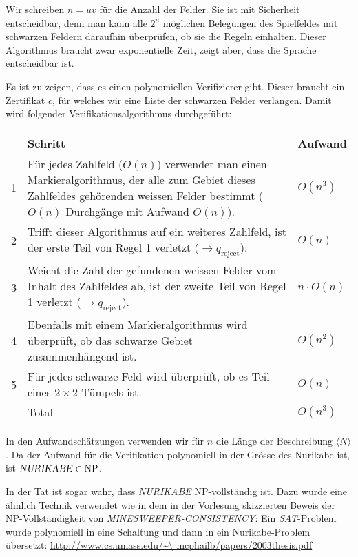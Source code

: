 \begin{loesung}
Wir schreiben $n=uv$ für die Anzahl der Felder.
Sie ist mit Sicherheit entscheidbar, denn man kann alle $2^{n}$
möglichen Belegungen des Spielfeldes mit schwarzen Feldern daraufhin
überprüfen, ob sie die Regeln einhalten. Dieser Algorithmus braucht
zwar exponentielle Zeit, zeigt aber, dass die Sprache entscheidbar ist.

Es ist zu zeigen, dass es einen polynomiellen Verifizierer gibt. Dieser
braucht ein Zertifikat $c$, für welches wir eine Liste der schwarzen
Felder verlangen. Damit wird folgender Verifikationsalgorithmus
durchgeführt:

\begin{tabular}{rll}
&Schritt&Aufwand\\
\hline
1&\begin{minipage}[t]{4.2truein}\strut
Für jedes Zahlfeld ($O(n)$) verwendet man einen Markieralgorithmus,
der alle zum Gebiet dieses Zahlfeldes gehörenden weissen
Felder bestimmt ($O(n)$ Durchgänge mit Aufwand
$O(n)$).\strut\end{minipage}&$O(n^3)$\\
2&\begin{minipage}[t]{4.2truein}\strut
Trifft dieser Algorithmus auf ein weiteres
Zahlfeld, ist der erste Teil von Regel 1 verletzt
($\to q_{\text{reject}}$).
\strut\end{minipage}&$O(n)$\\
3&\begin{minipage}[t]{4.2truein}\strut
Weicht die Zahl der gefundenen weissen Felder vom Inhalt des Zahlfeldes
ab, ist der zweite Teil von Regel 1 verletzt
($\to q_{\text{reject}}$).\strut\end{minipage}&$n\cdot O(n)$\\
4&\begin{minipage}[t]{4.2truein}\strut
Ebenfalls mit einem Markieralgorithmus wird überprüft, ob das
schwarze Gebiet zusammenhängend ist.
\strut\end{minipage}&$O(n^2)$\\
5&\begin{minipage}[t]{4.2truein}\strut
Für jedes schwarze Feld wird überprüft, ob es Teil eines
$2\times 2$-Tümpels ist.
\strut\end{minipage}&$O(n)$\\
\hline
&Total&$O(n^3)$
\end{tabular}

In den Aufwandschätzungen verwenden wir für $n$ die Länge der
Beschreibung $\langle N\rangle$. Da der Aufwand für die Verifikation
polynomiell in der Grösse des Nurikabe ist, ist
$\text{\textsl{NURIKABE}}\in\operatorname{NP}$.

In der Tat ist sogar wahr, dass \textsl{NURIKABE} NP-vollständig
ist. Dazu wurde eine ähnlich Technik verwendet wie in dem in
der Vorlesung skizzierten Beweis
der NP-Vollständigkeit von \textsl{MINESWEEPER-CONSISTENCY}:
Ein \textsl{SAT}-Problem wurde polynomiell in eine Schaltung und dann in
ein Nurikabe-Problem übersetzt:
\url{http://www.cs.umass.edu/\~\ mcphailb/papers/2003thesis.pdf}
\end{loesung}
